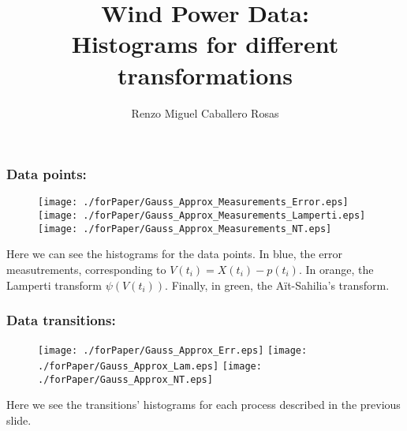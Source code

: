 \documentclass[aspectratio=169]{beamer}\usepackage[utf8]{inputenc}
\title{Wind Power Data:\\
Histograms for different transformations}
\subtitle{Renzo Miguel Caballero Rosas}
\begin{document}
\begin{frame}
\titlepage
\end{frame}

\begin{frame}\frametitle{Data points:}
\begin{figure}[ht!]
\centering
{\texttt{[image: ./forPaper/Gauss\_Approx\_Measurements\_Error.eps]}}
{\texttt{[image: ./forPaper/Gauss\_Approx\_Measurements\_Lamperti.eps]}}
{\texttt{[image: ./forPaper/Gauss\_Approx\_Measurements\_NT.eps]}}
\end{figure}
Here we can see the histograms for the data points. {\color{blue}In blue}, the error measutrements, corresponding to $V(t_i)=X(t_i)-p(t_i)$. {\color{orange}In orange}, the Lamperti transform $\psi(V(t_i))$. Finally, {\color{green}in green}, the A\"it-Sahilia's transform.
\end{frame}

\begin{frame}\frametitle{Data transitions:}
\begin{figure}[ht!]
\centering
{\texttt{[image: ./forPaper/Gauss\_Approx\_Err.eps]}}
{\texttt{[image: ./forPaper/Gauss\_Approx\_Lam.eps]}}
{\texttt{[image: ./forPaper/Gauss\_Approx\_NT.eps]}}
\end{figure}
Here we see the transitions' histograms for each process described in the previous slide.
\end{frame}
\end{document}
